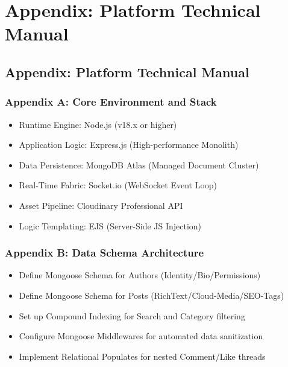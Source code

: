 \documentclass[12pt,a4paper]{report}
\begin{document}
\chapter{Appendix: Platform Technical Manual}

\section{Appendix: Platform Technical Manual}

\subsection{Appendix A: Core Environment and Stack}
\begin{itemize}
    \item Runtime Engine: Node.js (v18.x or higher)
    \item Application Logic: Express.js (High-performance Monolith)
    \item Data Persistence: MongoDB Atlas (Managed Document Cluster)
    \item Real-Time Fabric: Socket.io (WebSocket Event Loop)
    \item Asset Pipeline: Cloudinary Professional API
    \item Logic Templating: EJS (Server-Side JS Injection)
\end{itemize}

\subsection{Appendix B: Data Schema Architecture}
\begin{itemize}
    \item Define Mongoose Schema for Authors (Identity/Bio/Permissions)
    \item Define Mongoose Schema for Posts (RichText/Cloud-Media/SEO-Tags)
    \item Set up Compound Indexing for Search and Category filtering
    \item Configure Mongoose Middlewares for automated data sanitization
    \item Implement Relational Populates for nested Comment/Like threads
\end{itemize}
\end{document}
